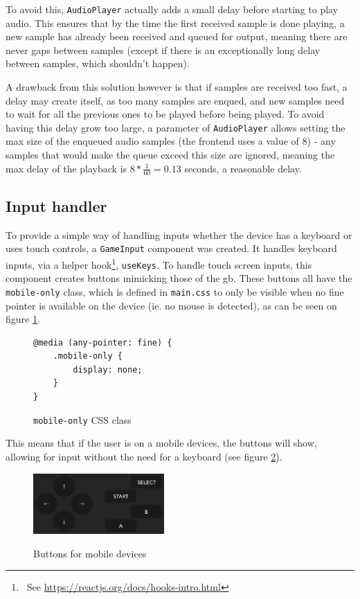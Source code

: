 \documentclass[11pt]{informatics-report}
\newcommand{\ftnt}[1]{\footnote{~See \url{#1}}}
\begin{document}
To avoid this, \texttt{AudioPlayer} actually adds a small delay before starting to play audio. This ensures that by the time the first received sample is done playing, a new sample has already been received and queued for output, meaning there are never gaps between samples (except if there is an exceptionally long delay between samples, which shouldn't happen).

A drawback from this solution however is that if samples are received too fast, a delay may create itself, as too many samples are enqued, and new samples need to wait for all the previous ones to be played before being played. To avoid having this delay grow too large, a parameter of \texttt{AudioPlayer} allows setting the max size of the enqueued audio samples (the frontend uses a value of 8) - any samples that would make the queue exceed this size are ignored, meaning the max delay of the playback is $8*\frac{1}{60}=0.13$ seconds, a reasonable delay.

\subsection{Input handler}

To provide a simple way of handling inputs whether the device has a keyboard or uses touch controls, a \texttt{GameInput} component was created. It handles keyboard inputs, via a helper hook\ftnt{https://reactjs.org/docs/hooks-intro.html}, \texttt{useKeys}. To handle touch screen inputs, this component creates buttons mimicking those of the \gls{gb}. These buttons all have the \texttt{mobile-only} class, which is defined in \texttt{main.css} to only be visible when no fine pointer is available on the device (ie. no mouse is detected), as can be seen on figure \ref{fig:css-mobile-only}.

\begin{figure}[h]
    \begin{verbatim}
@media (any-pointer: fine) {
    .mobile-only {
        display: none;
    }
}
    \end{verbatim}
    \caption{\texttt{mobile-only} CSS class}
    \label{fig:css-mobile-only}
\end{figure}

This means that if the user is on a mobile devices, the buttons will show, allowing for input without the need for a keyboard (see figure \ref{fig:ui-mobile-buttons}).

\begin{figure}[h]
    \centering
    \includegraphics[width=5cm]{images/ui-mobile-buttons}\\
    \caption{Buttons for mobile devices}
    \label{fig:ui-mobile-buttons}
\end{figure}
\end{document}

